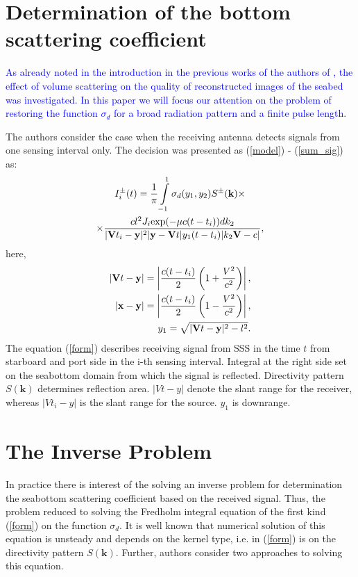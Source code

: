 \documentclass{procDDs}
\begin{document}
\section{Determination of the bottom scattering coefficient}


\textcolor{blue}{As already noted in the introduction in the previous works of the authors of \cite{AF2015, SPIE_KOV}, the effect of volume scattering on the quality of reconstructed images of the seabed was investigated. In this paper we will focus our attention on the problem of restoring the  function $\sigma_d$ for a broad radiation pattern and a finite pulse length.}

The authors consider the case when the receiving antenna detects signals from one sensing interval only. The decision was presented as (\ref{model}) - (\ref{sum_sig}) as:
\begin{multline}
	\label{form}
	I^\pm_i(t) = \frac{1}{\pi}\int\limits_{-1}^{1}\sigma_d(y_1,y_2) S^{\pm}(\mathbf{k}) \times \\ \times
	\frac{ cl^2J_i \text{exp}(-\mu c(t-t_i))dk_2}{|\mathbf{V}t_i-\mathbf{y}|^2|\mathbf{y}-\mathbf{V}t|y_1(t-t_i)|k_2 \mathbf{V}-c|},
\end{multline}
here, 
\begin{align*}
	|\mathbf{V}t - \mathbf{y}| = \left|\dfrac{c(t-t_i)}{2}\left(1+\dfrac{V^2}{c^2}\right) \right|, \\
	|\mathbf{x}-\mathbf{y}| = \left|\dfrac{c(t-t_i)}{2}\left(1-\dfrac{V^2}{c^2}\right) \right|, \\
	y_1 = \sqrt{|\mathbf{V}t-\mathbf{y}|^2 - l^2}.
\end{align*}
The equation (\ref{form}) describes receiving signal from SSS in the time $t$ from starboard and port side in the i-th sensing interval. Integral at the right side set on the seabottom domain from which the signal is reflected. Directivity pattern $S(\textbf{k})$ determines reflection area. $|Vt-y|$ denote the slant range for the receiver, whereas $|Vt_i-y|$   is the slant range for the source. $y_1$ is downrange.

\section{The Inverse Problem}
In practice there is interest of the solving an inverse problem for determination the seabottom scattering coefficient based on the received signal. Thus, the problem reduced to solving the Fredholm integral equation of the first kind (\ref{form}) on the function $\sigma_d$. It is well known that numerical solution of this equation is unsteady and depends on the kernel type, i.e. in (\ref{form}) is on the directivity pattern $S(\textbf{k})$. Further, authors consider two approaches to solving this equation.
\end{document}
